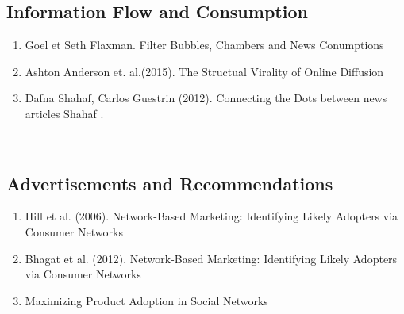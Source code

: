 \subsection{Information Flow and Consumption}  
\begin{enumerate}  
\item  Goel et Seth Flaxman. Filter Bubbles, Chambers and News Conumptions  
\item  Ashton Anderson et.  al.(2015).  The Structual Virality of Online Diffusion\cite{Goel_2015}  
\item  Dafna Shahaf, Carlos Guestrin (2012). Connecting the Dots between news articles Shahaf  . \cite{Shahaf:2012:CTD:2086737.2086744} \end{enumerate}  
\\  
\subsection{Advertisements and Recommendations}  
\begin{enumerate}  
\item Hill et al. (2006).  Network-Based Marketing: Identifying Likely Adopters via Consumer Networks\cite{Hill_2006}  
\item  Bhagat et al. (2012). Network-Based Marketing: Identifying Likely Adopters via Consumer Networks  
\item   Maximizing Product Adoption in Social Networks\cite{Bhagat:2012:MPA:2124295.2124368} 
\end{enumerate} 